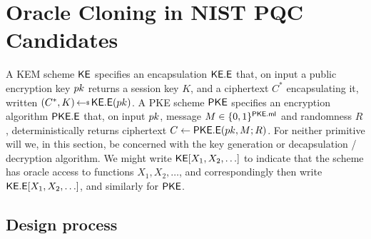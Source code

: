 \section{Oracle Cloning in NIST PQC Candidates}
\label{sec-pqc}

 A KEM scheme ${\mathsf{KE}}$ specifies an encapsulation $\mathsf{{\mathsf{KE}}.E}$ that, on input a public encryption key $pk$ returns a session key $K$, and a ciphertext $C^*$ encapsulating it, written $(C^*,K)\getsr \kemEnc(\pk)$. A PKE scheme ${\mathsf{PKE}}$ specifies an encryption algorithm $\mathsf{{\mathsf{PKE}}.E}$ that, on input $pk$, message $M\in\{0,1\}^{\mathsf{{\mathsf{PKE}}.ml}}$ and randomness $R$, deterministically returns ciphertext $C\gets\mathsf{{\mathsf{PKE}}.E}(pk,M;R)$. For neither primitive will we, in this section, be concerned with the key generation or decapsulation / decryption algorithm. We might write ${\mathsf{KE}}[X_1,X_2,\ldots]$ to indicate that the scheme has oracle access to functions $X_1,X_2,\ldots$, and correspondingly then write $\mathsf{{\mathsf{KE}}.E}[X_1,X_2,\ldots]$, and similarly for ${\mathsf{PKE}}$.

\subsection{Design process} 

